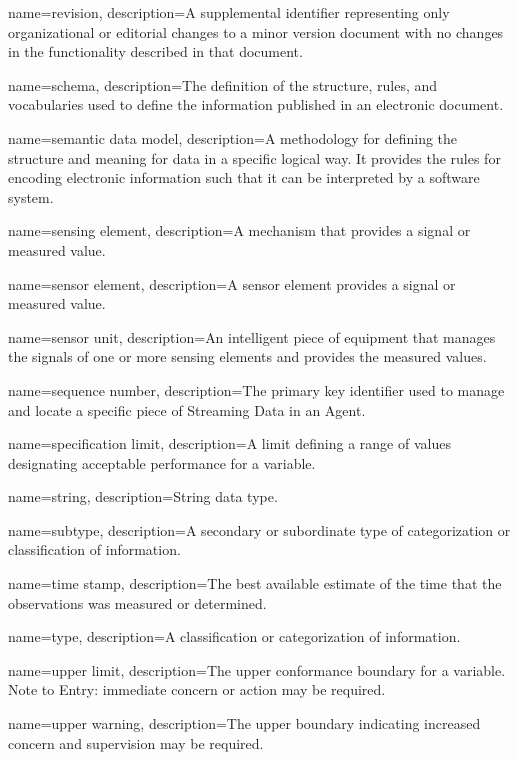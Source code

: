 {
    name={revision},
	description={A supplemental identifier representing only organizational or editorial changes to a \gls{minor} version document with no changes in the functionality described in that document.}
}

{
    name={schema},
	description={The definition of the structure, rules, and vocabularies used to define the information published in an electronic document.}
}

{
    name={semantic data model},
	description={A methodology for defining the structure and meaning for data in a specific logical way. It provides the rules for encoding electronic information such that it can be interpreted by a software system. }
}

{
    name={sensing element},
	description={A mechanism that provides a signal or measured value.}
}

{
    name={sensor element},
	description={A \gls{sensor element} provides a signal or measured value.}
}

{
    name={sensor unit},
	description={An intelligent piece of equipment that manages the signals of one or more \glspl{sensing element} and provides the measured values.}
}

{
    name={sequence number},
	description={The primary key identifier used to manage and locate a specific piece of \gls{Streaming Data} in an \gls{Agent}.}
}

{
    name={specification limit},
	description={A limit defining a range of values designating acceptable performance for a variable.}
}

{
    name={string},
	description={String data type.}
}

{
    name={subtype},
	description={A secondary or subordinate type of categorization or classification of information.}
}

{
    name={time stamp},
	description={The best available estimate of the time that the \glspl{observation} was measured or determined.}
}

{
    name={type},
	description={A classification or categorization of information.}
}

{
    name={upper limit},
	description={The upper conformance boundary for a variable.
Note to Entry: immediate concern or action may be required.}
}

{
    name={upper warning},
	description={The upper boundary indicating increased concern and supervision may be required.}
}
